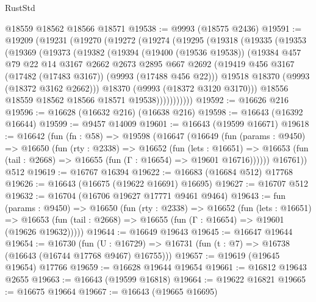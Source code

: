 \begin{lexlean}{RustStd}
\begin{coremodule}
    @18559
    @18562
    @18566
    @18571
@19538 := @9993 (@18575 @2436)
@19591 := @19209
    (@19231
      (@19270
        (@19272
          (@19274
            (@19295
              (@19318
                (@19335
                  (@19353
                    (@19369
                      (@19373
                        (@19382
                          (@19394
                            (@19400 (@19536 @19538))
                            (@19384
                              @457
                              @79
                              @22
                              @14
                              @3167
                              @2662
                              @2673
                              @2895
                              @667
                              @2692
                              (@19419 @456 @3167 (@17482 (@17483 @3167)) (@9993 (@17488 @456 @22)))
                              @19518
                              @18370
                              (@9993 (@18372 @3162 @2662)))
                            @18370
                            (@9993 (@18372 @3120 @3170)))
                          @18556
                          @18559
                          @18562
                          @18566
                          @18571
                          @19538)))))))))))
@19592 := @16626 @216
@19596 := @16628 (@16632 @216) (@16638 @216)
@19598 := @16643 (@16392 @16644)
@19599 := @9457 @14009
@19601 := @16643 (@19599 @16671)
@19618 := @16642
    (fun (fn : @58) =>
    @19598
      (@16647
        (@16649
          (fun (params : @9450) =>
          @16650
            (fun (rty : @2338) =>
            @16652
              (fun (lets : @16651) =>
              @16653 (fun (tail : @2668) => @16655 (fun (Γ : @16654) => @19601 @16716))))))
        @16761))
    @512
@19619 := @16767 @16394
@19622 := @16683 (@16684 @512) @17768
@19626 := @16643 (@16675 (@19622 @16691) @16695)
@19627 := @16707 @512
@19632 := @16704 (@16706 @19627 @17771 @9461 @9464)
@19643 := fun (params : @9450) =>
  @16650
    (fun (rty : @2338) =>
    @16652
      (fun (lets : @16651) =>
      @16653 (fun (tail : @2668) => @16655 (fun (Γ : @16654) => @19601 (@19626 @19632)))))
@19644 := @16649 @19643
@19645 := @16647 @19644
@19654 := @16730
    (fun (U : @16729) => @16731 (fun (t : @7) => @16738 (@16643 (@16744 @17768 @9467) @16755)))
@19657 := @19619 (@19645 @19654) @17766
@19659 := @16628 @19644 @19654
@19661 := @16812 @19643 @2655
@19663 := @16643 (@19599 @16818)
@19664 := @19622 @16821
@19665 := @16675 @19664
@19667 := @16643 (@19665 @16695)

\end{coremodule}
\end{lexlean}
